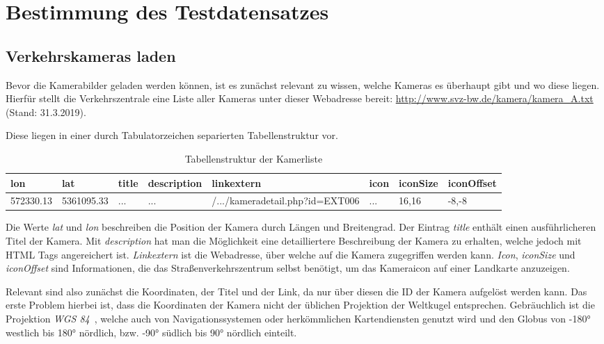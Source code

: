 \section{Bestimmung des Testdatensatzes}
\subsection{Verkehrskameras laden}
\label{sec:AnaCam}
Bevor die Kamerabilder geladen werden können, ist es zunächst relevant zu wissen, welche Kameras es überhaupt gibt und wo diese liegen.
Hierfür stellt die Verkehrszentrale eine Liste aller Kameras unter dieser Webadresse bereit: \url{http://www.svz-bw.de/kamera/kamera_A.txt} (Stand: 31.3.2019).

Diese liegen in einer durch Tabulatorzeichen separierten Tabellenstruktur vor.

\begin{table}[ht]
  \centering
\scriptsize
    \begin{tabular}{ | l | l | l | l | l | l | l | l |}
    \hline
		lon & lat & title & description & linkextern & icon & iconSize & iconOffset \\ \hline
    572330.13 &
		5361095.33 &
		... &
		... &
		/.../kameradetail.php?id=EXT006 &
		... &
		16,16 &
		-8,-8 \\
    \hline
    \end{tabular}
		\caption{Tabellenstruktur der Kamerliste}
\end{table}

Die Werte {\em lat} und {\em lon} beschreiben die Position der Kamera durch Längen und Breitengrad.
Der Eintrag {\em title} enthält einen ausführlicheren Titel der Kamera. Mit {\em description} hat man die Möglichkeit eine detailliertere Beschreibung der Kamera zu erhalten, welche jedoch mit HTML Tags angereichert ist. {\em Linkextern} ist die Webadresse, über welche auf die Kamera zugegriffen werden kann. {\em Icon}, {\em iconSize} und {\em iconOffset} sind Informationen, die das Straßenverkehrszentrum selbst benötigt, um das Kameraicon auf einer Landkarte anzuzeigen.

Relevant sind also zunächst die Koordinaten, der Titel und der Link, da nur über diesen die ID der Kamera aufgelöst werden kann.
Das erste Problem hierbei ist, dass die Koordinaten der Kamera nicht der üblichen Projektion der Weltkugel entsprechen. Gebräuchlich ist die Projektion {\em WGS 84}~\cite{wgs84}, welche auch von Navigationssystemen oder herkömmlichen Kartendiensten genutzt wird und den Globus von -180° westlich bis 180° nördlich, bzw. -90° südlich bis 90° nördlich einteilt.


